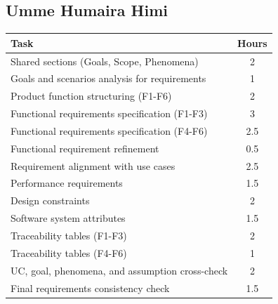 \subsection{Umme Humaira Himi}

{\centering
\begin{tabular}{@{}p{8cm}c@{}}
	\toprule
	\textbf{Task} & \textbf{Hours} \\
\midrule
Shared sections (Goals, Scope, Phenomena) & 2 \\
Goals and scenarios analysis for requirements & 1 \\
Product function structuring (F1-F6) & 2 \\
Functional requirements specification (F1-F3) & 3 \\
Functional requirements specification (F4-F6) & 2.5 \\
Functional requirement refinement & 0.5 \\
Requirement alignment with use cases & 2.5 \\
Performance requirements & 1.5 \\
Design constraints & 2 \\
Software system attributes & 1.5 \\
Traceability tables (F1-F3) & 2 \\
Traceability tables (F4-F6) & 1 \\
UC, goal, phenomena, and assumption cross-check & 2 \\
Final requirements consistency check & 1.5 \\
\bottomrule
\end{tabular}\par}



